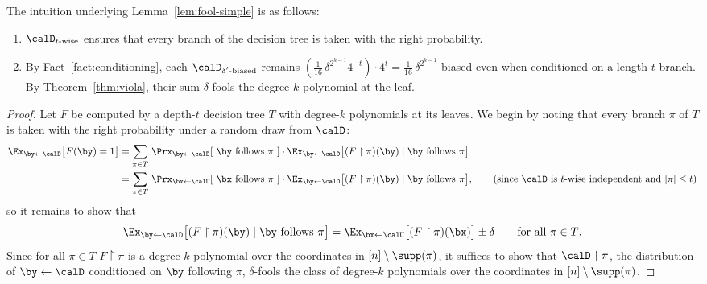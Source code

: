 \documentclass[11pt]{article}
\numberwithin{equation}{section}
\theoremstyle{definition}
\theoremstyle{plain}
\theoremstyle{plain}
\newcommand{\uhr}{\upharpoonright}
\begin{document}
The intuition underlying Lemma~\ref{lem:fool-simple} is as follows: 

\begin{enumerate}
\item $\calD_{\text{$t$-wise}}$ ensures that every branch of the decision tree is taken with the right probability. 
\item By Fact~\ref{fact:conditioning}, each $\calD_{\text{$\delta'$-biased}}$ remains $(\frac1{16}\,\delta^{2^{k-1}}4^{-t}) \cdot 4^t =  \frac1{16}\,\delta^{2^{k-1}}$-biased even when conditioned on a length-$t$ branch.  By Theorem~\ref{thm:viola}, their sum $\delta$-fools the degree-$k$ polynomial at the leaf. 
\end{enumerate} 


\begin{proof} 
Let $F$ be computed by a depth-$t$ decision tree $T$ with degree-$k$ polynomials at its leaves.  We begin by noting that every branch $\pi$ of $T$ is taken with the right probability under a random draw from $\calD$: 
\begin{align*}
\Ex_{\by\leftarrow\calD}\big[ F(\by) = 1\big] &= \sum_{\pi \in T}\, \Prx_{\by\leftarrow\calD}[\text{~$\by$ follows $\pi$~}] \cdot \Ex_{\by\leftarrow\calD}\big[ (F\uhr\pi)(\by)\mid \text{$\by$ follows $\pi$} \big] \\
&= \sum_{\pi \in T}\, \Prx_{\bx\leftarrow\calU}[\text{~$\bx$ follows $\pi$~}] \cdot \Ex_{\by\leftarrow\calD}\big[ (F\uhr\pi)(\by)\mid \text{$\by$ follows $\pi$} \big], \tag*{(since $\calD$ is $t$-wise independent and $|\pi|\le t$)}
\end{align*}
so it remains to show that 
\[ \Ex_{\by\leftarrow\calD}\big[ (F\uhr\pi)(\by)\mid \text{$\by$ follows $\pi$} \big]  = \Ex_{\bx\leftarrow\calU}\big[ (F\uhr\pi)(\bx) \big] \pm \delta \qquad \text{for all $\pi \in T$.}  \]
Since for all $\pi\in T$ $F \uhr \pi$ is a degree-$k$ polynomial over the coordinates in $[n] \setminus \supp(\pi)$, it suffices to show that $\calD \uhr \pi$, the distribution of $\by\leftarrow\calD$ conditioned on $\by$ following $\pi$, $\delta$-fools the class of degree-$k$ polynomials over the coordinates in $[n] \setminus \supp(\pi)$.
 

\end{proof}
\end{document}
